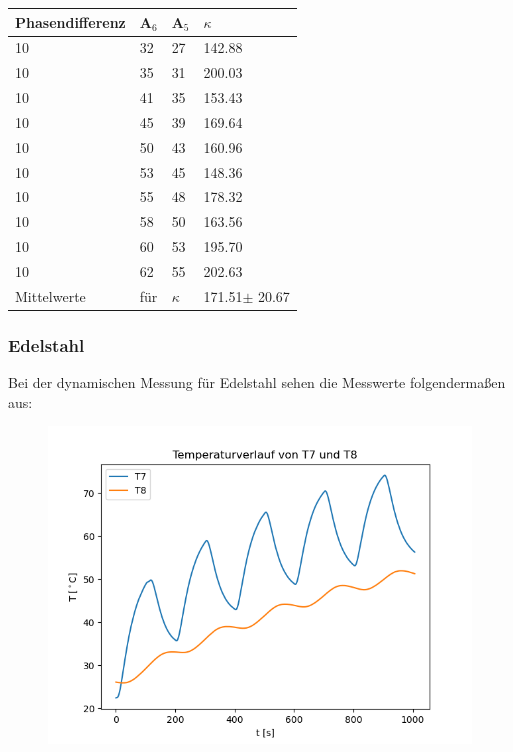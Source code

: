 \begin{minipage}{\linewidth}
    \begin{table}[H]
        \centering
    \begin{tabular}{llll}
        \toprule
        Phasendifferenz & A$_6$ & A$_5$ & $\kappa$  \\
        \midrule
        10 & 32 & 27 & 142.88 \\
        10 & 35 & 31 & 200.03 \\
        10 & 41 & 35 & 153.43 \\
        10 & 45 & 39 & 169.64 \\
        10 & 50 & 43 & 160.96 \\
        10 & 53 & 45 & 148.36 \\
        10 & 55 & 48 & 178.32 \\
        10 & 58 & 50 & 163.56 \\
        10 & 60 & 53 & 195.70 \\
        10 & 62 & 55 & 202.63 \\
        \midrule
        Mittelwerte&für&$\kappa$&171.51$\pm$ 20.67\\
        \bottomrule   
    \end{tabular}
\end{table}
\end{minipage}



\subsubsection{Edelstahl}

Bei der dynamischen Messung für Edelstahl sehen die Messwerte folgendermaßen aus:

\begin{figure}[H]
    \centering
    \includegraphics{steel.png}
\end{figure}

